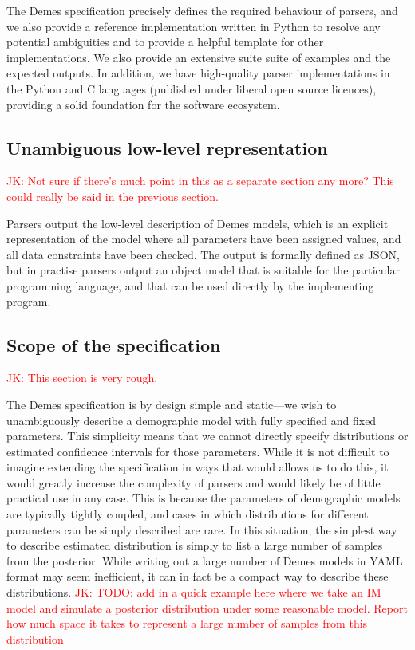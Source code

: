 \documentclass[11pt]{article}
\newcommand{\jkcomment}[1]{{\textcolor{red}{JK: #1}}}
\begin{document}
The Demes specification precisely defines the required behaviour of
parsers, and we also provide a reference implementation written
in Python to resolve any potential ambiguities and to provide a
helpful template for other implementations. We also provide an
extensive suite suite of examples and the expected outputs. In addition,
we have high-quality parser implementations in the Python and C
languages (published under liberal open source licences),
providing a solid foundation for the software ecosystem.


\subsection*{Unambiguous low-level representation}

\jkcomment{Not sure if there's much point in this as a separate section any
more? This could really be said in the previous section.}

Parsers output the low-level description of Demes models,
which is an explicit representation
of the model where all parameters have been assigned values, and
all data constraints have been checked. The output is formally defined
as JSON, but in practise parsers output an object model that
is suitable for the particular programming language, and
that can be used directly by the implementing program.


\subsection*{Scope of the specification}
\jkcomment{This section is very rough.}


The Demes specification is by design simple and static---we wish to
unambiguously describe a demographic model with fully specified
and fixed parameters. This simplicity means that we cannot directly
specify distributions or estimated confidence intervals
for those parameters. While it is not difficult to imagine extending
the specification in ways that would allows us to do this, it would
greatly increase the complexity of parsers and would likely be of
little practical use in any case. This is because the parameters of
demographic models are typically tightly coupled, and cases in which
distributions for different parameters can be simply described are rare.
In this situation, the simplest way to describe estimated
distribution is simply to list a large number of samples from
the posterior. While writing out a large number of Demes models in
YAML format may seem inefficient, it can in fact be a compact
way to describe these distributions.
\jkcomment{TODO: add in a quick example here where we take an IM model
and simulate a posterior distribution under some reasonable model. Report
how much space it takes to represent a large number of samples from this
distribution}
\end{document}
